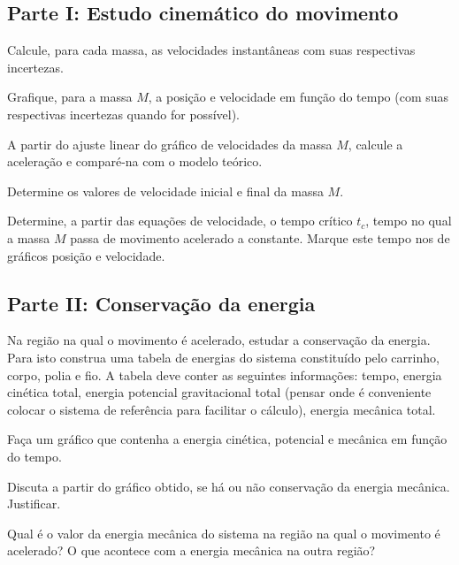 \subsection*{Parte I: Estudo cinemático do movimento}

\begin{num}
\item Calcule, para cada massa, as velocidades instantâneas com suas respectivas incertezas.
\item Grafique, para a massa $M$, a posição e velocidade em função do tempo (com suas respectivas incertezas quando for possível). 
\item A partir do ajuste linear do gráfico de velocidades da massa $M$, calcule a aceleração e comparé-na com o modelo teórico.
\item Determine os valores de velocidade inicial e final da massa $M$.
\item Determine, a partir das equações de velocidade, o tempo crítico $t_c$, tempo no qual a massa $M$ passa de movimento acelerado a constante. Marque este tempo nos de gráficos posição e velocidade. 

\end{num}
\noindent
\vspace{-1.5cm}
\subsection*{Parte II: Conservação da energia}

\begin{num}
\setcounter{enumi}{7}

\item Na região na qual o movimento é acelerado, estudar a conservação da energia. Para isto construa uma tabela de energias do sistema constituído pelo carrinho, corpo, polia e fio. A tabela deve conter as seguintes informações: tempo, energia cinética total, energia potencial gravitacional total (pensar onde é conveniente colocar o sistema de referência para facilitar o cálculo), energia mecânica total. 
\item Faça um gráfico que contenha a energia cinética, potencial e mecânica em função do tempo.
\item Discuta a partir do gráfico obtido, se há ou não conservação da energia mecânica. Justificar.
\item Qual é o valor da energia mecânica do sistema na região na qual o movimento é acelerado? O que acontece com a energia mecânica na outra região?
\end{num}

